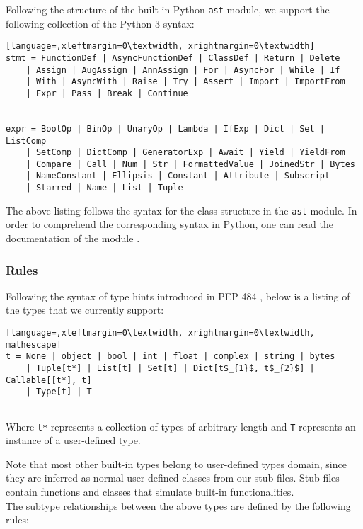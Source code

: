 Following the structure of the built-in Python \lstinline|ast| module, we support the following collection of the Python 3 syntax:

\begin{lstlisting}[language=,xleftmargin=0\textwidth, xrightmargin=0\textwidth]
stmt = FunctionDef | AsyncFunctionDef | ClassDef | Return | Delete
	| Assign | AugAssign | AnnAssign | For | AsyncFor | While | If
	| With | AsyncWith | Raise | Try | Assert | Import | ImportFrom
	| Expr | Pass | Break | Continue


expr = BoolOp | BinOp | UnaryOp | Lambda | IfExp | Dict | Set | ListComp
	| SetComp | DictComp | GeneratorExp | Await | Yield | YieldFrom
	| Compare | Call | Num | Str | FormattedValue | JoinedStr | Bytes
	| NameConstant | Ellipsis | Constant | Attribute | Subscript
	| Starred | Name | List | Tuple

\end{lstlisting}
The above listing follows the syntax for the class structure in the \lstinline|ast| module. In order to comprehend the corresponding syntax in Python, one can read the documentation of the module \cite{ast_documentation}.


\subsubsection{Rules}
Following the syntax of type hints introduced in PEP 484 \cite{484}, below is a listing of the types that we currently support:

\begin{lstlisting}[language=,xleftmargin=0\textwidth, xrightmargin=0\textwidth, mathescape]
t = None | object | bool | int | float | complex | string | bytes
	| Tuple[t*] | List[t] | Set[t] | Dict[t$_{1}$, t$_{2}$] | Callable[[t*], t]
	| Type[t] | T
	
\end{lstlisting}

Where \lstinline|t*| represents a collection of types of arbitrary length and \lstinline|T| represents an instance of a user-defined type.

Note that most other built-in types belong to user-defined types domain, since they are inferred as normal user-defined classes from our stub files. Stub files contain functions and classes that simulate built-in functionalities. \\

The subtype relationships between the above types are defined by the following rules:

